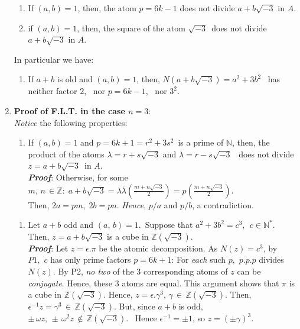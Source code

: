 \documentclass[11pt,a4paper]{article}
\begin{document}
\begin{enumerate}
\begin{enumerate}[(R1)]
     \item If $(a,b)=1$, then, the atom $p=6k-1$ does not divide $a+b\sqrt{-3}$ in $A$.
     \item if $(a,b)=1$, then, the square of the atom $\sqrt{-3}$\, does not divide $a+b\sqrt{-3}$ in $A$.
  \end{enumerate}
  In particular we have:
  \begin{enumerate}[(P1)]
  \item If $a+b$ is old and $(a,b)=1$, then, $\textit{N}(a+b\displaystyle\sqrt{-3})=a^2+3b^2$ \, has neither factor $2$, \, nor $p=6k-1$, \, nor $3^2$.
      \end{enumerate}
\item \textbf{Proof of F.L.T. in the case $n=3$}:\\
  \textit{Notice} the following properties:
  \begin{enumerate}[(P2)]
    \item If $(a,b)=1$ and $p=6k+1=r^2+3s^2$\, is a prime of $\mathbb{N}$, then, the product of the atoms $\lambda = r+s\sqrt{-3}$ and $\overline{\lambda}=r-s\sqrt{-3}$ \, does not divide $z=a+b\sqrt{-3}$ \,in $A$.\\
%
        \textbf{\textit{Proof}}: Otherwise, for some $m,\,n\,\in \mathbb{Z}: \; a+b\sqrt{-3}=\lambda \overline{\lambda}\displaystyle (\frac{m+n\sqrt{-3}}{2})=p\displaystyle (\frac{m+n\sqrt{-3}}{2})$.\\
        Then, $2a=pm,\; 2b=pn$. \textit{Hence}, $p/a$ and $p/b$, a contradiction.
     \end{enumerate}
  \begin{enumerate}[(P3)]
    \item Let $a+b$ odd and $(a,\,b)=1$. \,Suppose that $a^2+3b^2=c^3,\;\,c\in\mathbb{N}^*$.  Then, $z=a+b\sqrt{-3}$\; is a cube in $\mathbb{Z}(\sqrt{-3})$.\\
%
       \textbf{\textit{Proof}}: Let $z=\epsilon .\pi$ be the atomic decomposition. As $N(z)=c^3$, by $P1,\,\, c$ has only prime factors $p=6k+1$: For \textit{each} such $p,\,\, p.p.p $ divides $N(z)$. By P2, \textit{no two} of the $3$ corresponding atoms of $z$ can be \textit{conjugate}. Hence, these 3 atoms are equal. This argument shows that $\pi$ is a cube in $\mathbb{Z}(\sqrt{-3})$. Hence, $z=\epsilon .\gamma ^3,\, \gamma\, \in\, \mathbb{Z}(\sqrt{-3})$. Then, $\epsilon^{-1}z=\gamma^3\,\in\,\mathbb{Z}(\sqrt{-3})$. But, since $a+b$ is odd, $\pm \,\omega z, \,\pm\, \omega^2z\,\notin \,\mathbb{Z}(\sqrt{-3})$. \, Hence $\epsilon^{-1}=\pm1$, so $z=(\pm\gamma)^3$.
  \end{enumerate}

\end{enumerate}
\end{document}
